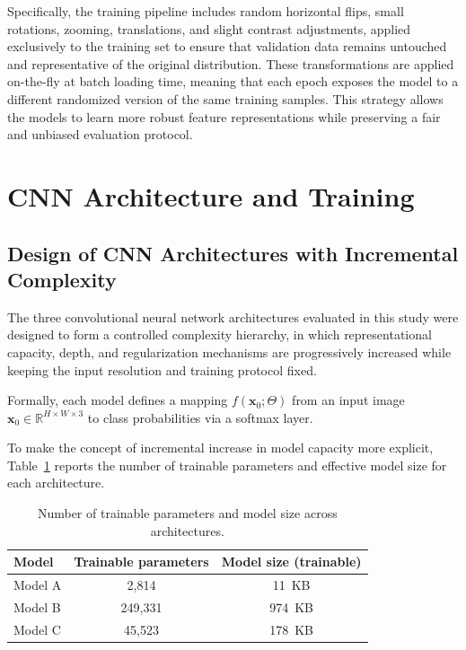 \documentclass{article}
\begin{document}
Specifically, the training pipeline includes random horizontal flips,
small rotations, zooming, translations, and slight contrast adjustments, 
applied exclusively to the training set to ensure that validation data remains untouched and
representative of the original distribution. These transformations are applied
on-the-fly at batch loading time, meaning that each epoch exposes the model 
to a different randomized version of the same training samples. This strategy allows the
models to learn more robust feature representations while preserving a
fair and unbiased evaluation protocol.

\section{CNN Architecture and Training}
\subsection{Design of CNN Architectures with Incremental Complexity}

The three convolutional neural network architectures evaluated in this 
study were designed to form a controlled complexity hierarchy, 
in which representational capacity, depth, and regularization mechanisms 
are progressively increased while keeping the input resolution and 
training protocol fixed. 

Formally, each model defines a mapping 
$f(\mathbf{x}_0; \Theta)$ from an input image 
$\mathbf{x}_0 \in \mathbb{R}^{H \times W \times 3}$ 
to class probabilities via a softmax layer.

To make the concept of incremental increase in model capacity more explicit,
Table~\ref{tab:model_capacity} reports the number of trainable parameters
and effective model size for each architecture.

\begin{table}[h]
\centering
\caption{Number of trainable parameters and model size across architectures.}
\label{tab:model_capacity}
\begin{tabular}{lcc}
\hline
\textbf{Model} &
\textbf{Trainable parameters} &
\textbf{Model size (trainable)} \\
\hline
Model A & 2{,}814   & 11~KB  \\
Model B & 249{,}331 & 974~KB \\
Model C & 45{,}523  & 178~KB \\
\hline
\end{tabular}
\end{table}
\end{document}
